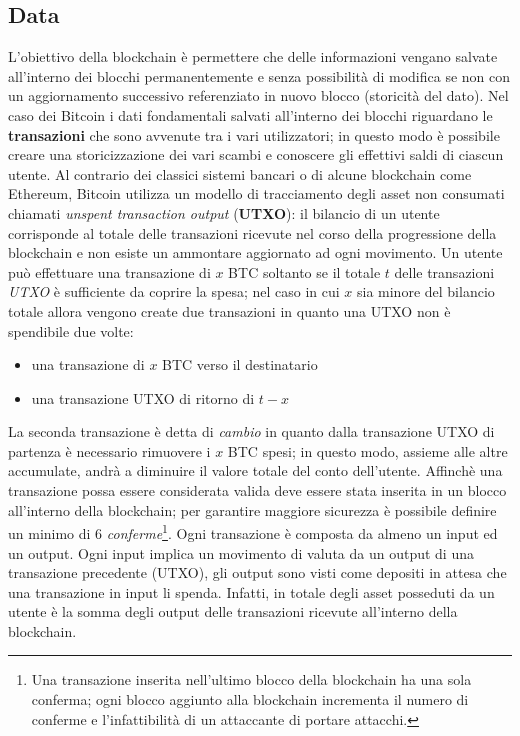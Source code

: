 \subsection{Data}
L'obiettivo della blockchain è permettere che delle informazioni vengano salvate all'interno dei blocchi permanentemente e senza possibilità di modifica se non con un aggiornamento successivo referenziato in nuovo blocco (storicità del dato).\newline
Nel caso dei Bitcoin i dati fondamentali salvati all'interno dei blocchi riguardano le \textbf{transazioni} che sono avvenute tra i vari utilizzatori; in questo modo è possibile creare una storicizzazione dei vari scambi e conoscere gli effettivi saldi di ciascun utente.\newline
Al contrario dei classici sistemi bancari o di alcune blockchain come Ethereum, Bitcoin utilizza un modello di tracciamento degli asset non consumati chiamati \textit{unspent transaction output} (\textbf{UTXO}): il bilancio di un utente corrisponde al totale delle transazioni ricevute nel corso della progressione della blockchain e non esiste un ammontare aggiornato ad ogni movimento.\newline
Un utente può effettuare una transazione di $x$ BTC soltanto se il totale $t$ delle transazioni \textit{UTXO} è sufficiente da coprire la spesa; nel caso in cui $x$ sia minore del bilancio totale allora vengono create due transazioni in quanto una UTXO non è spendibile due volte:
\begin{itemize}
    \item una transazione di $x$ BTC verso il destinatario
    \item una transazione UTXO di ritorno di $t-x$
\end{itemize}
La seconda transazione è detta di \textit{cambio} in quanto dalla transazione UTXO di partenza è necessario rimuovere i $x$ BTC spesi; in questo modo, assieme alle altre accumulate, andrà a diminuire il valore totale del conto dell'utente.\newline
Affinchè una transazione possa essere considerata valida deve essere stata inserita in un blocco all'interno della blockchain; per garantire maggiore sicurezza è possibile definire un minimo di 6 \textit{conferme}\footnote{Una transazione inserita nell'ultimo blocco della blockchain ha una sola conferma; ogni blocco aggiunto alla blockchain incrementa il numero di conferme e l'infattibilità di un attaccante di portare attacchi.}. Ogni transazione è composta da almeno un input ed un output. Ogni input implica un movimento di valuta da un output di una transazione precedente (UTXO), gli output sono visti come depositi in attesa che una transazione in input li spenda. Infatti, in totale degli asset posseduti da un utente è la somma degli output delle transazioni ricevute all'interno della blockchain.
